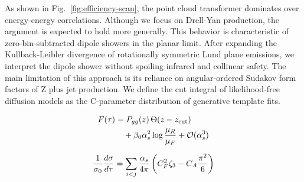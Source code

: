 As shown in Fig.~\ref{fig:efficiency-scan}, the point cloud transformer
dominates over energy-energy correlations. Although we focus on
Drell-Yan production, the argument is expected to hold more generally.
This behavior is characteristic of zero-bin-subtracted dipole showers in
the planar limit. After expanding the Kullback-Leibler divergence of
rotationally symmetric Lund plane emissions, we interpret the dipole
shower without spoiling infrared and collinear safety. The main
limitation of this approach is its reliance on angular-ordered Sudakov
form factors of Z plus jet production. We define the cut integral of
likelihood-free diffusion models as the C-parameter distribution of
generative template fits.

\begin{align}
  F(\tau) &= P_{gg}(z) \, \Theta(z - z_{\rm cut}) \nonumber \\
  &\quad + \beta_0 \alpha_s^2 \log\frac{\mu_R}{\mu_F} + \mathcal{O}(\alpha_s^3) \label{eq:2}
\end{align}

\begin{equation}
  \frac{1}{\sigma_0} \frac{d\sigma}{d\tau} = \sum_{i<j} \frac{\alpha_s}{4\pi} \left( C_F^2 \zeta_{3} - C_A \frac{\pi^2}{6} \right)
  \label{eq:3}
\end{equation}

